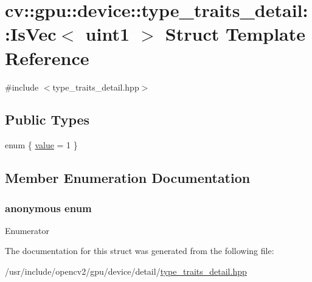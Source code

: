 \hypertarget{structcv_1_1gpu_1_1device_1_1type__traits__detail_1_1IsVec_3_01uint1_01_4}{\section{cv\-:\-:gpu\-:\-:device\-:\-:type\-\_\-traits\-\_\-detail\-:\-:Is\-Vec$<$ uint1 $>$ Struct Template Reference}
\label{structcv_1_1gpu_1_1device_1_1type__traits__detail_1_1IsVec_3_01uint1_01_4}
}


{\ttfamily \#include $<$type\-\_\-traits\-\_\-detail.\-hpp$>$}

\subsection*{Public Types}
\begin{DoxyCompactItemize}
\item 
enum \{ \hyperlink{structcv_1_1gpu_1_1device_1_1type__traits__detail_1_1IsVec_3_01uint1_01_4_a936fb6fe707250e9a70df2064d432a5aaf82500fd1706dc55d5c074fd6d61badc}{value} = 1
 \}
\end{DoxyCompactItemize}


\subsection{Member Enumeration Documentation}
\hypertarget{structcv_1_1gpu_1_1device_1_1type__traits__detail_1_1IsVec_3_01uint1_01_4_a936fb6fe707250e9a70df2064d432a5a}{\subsubsection[{anonymous enum}]{\setlength{\rightskip}{0pt plus 5cm}anonymous enum}}\label{structcv_1_1gpu_1_1device_1_1type__traits__detail_1_1IsVec_3_01uint1_01_4_a936fb6fe707250e9a70df2064d432a5a}
\begin{Desc}
\item[Enumerator]\par
\begin{description}
\item[{\em 
\hypertarget{structcv_1_1gpu_1_1device_1_1type__traits__detail_1_1IsVec_3_01uint1_01_4_a936fb6fe707250e9a70df2064d432a5aaf82500fd1706dc55d5c074fd6d61badc}{value}\label{structcv_1_1gpu_1_1device_1_1type__traits__detail_1_1IsVec_3_01uint1_01_4_a936fb6fe707250e9a70df2064d432a5aaf82500fd1706dc55d5c074fd6d61badc}
}]\end{description}
\end{Desc}


The documentation for this struct was generated from the following file\-:\begin{DoxyCompactItemize}
\item 
/usr/include/opencv2/gpu/device/detail/\hyperlink{type__traits__detail_8hpp}{type\-\_\-traits\-\_\-detail.\-hpp}\end{DoxyCompactItemize}
